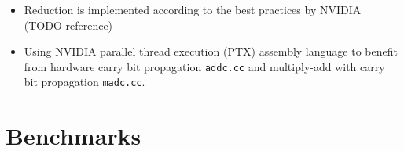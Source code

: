 \documentclass[oribibl,a4paper]{llncs2e/llncs}
\begin{document}
\begin{itemize}
\item Reduction is implemented according to the best practices by NVIDIA (TODO reference)
\item Using NVIDIA parallel thread execution (PTX) assembly language to benefit from hardware carry bit propagation \verb|addc.cc| and multiply-add with carry bit propagation \verb|madc.cc|.
\end{itemize}

\section{Benchmarks}
\end{document}
